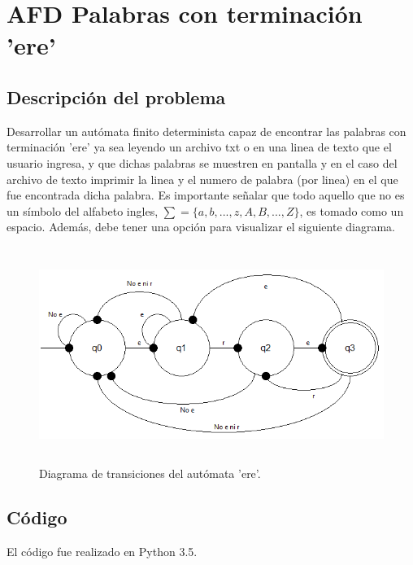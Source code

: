 \section{AFD Palabras con terminación 'ere'}
	\subsection{Descripción del problema}
	Desarrollar un autómata finito determinista capaz de encontrar las palabras con terminación 'ere' ya sea leyendo un archivo txt o en una linea de texto que el usuario ingresa, y que dichas palabras se muestren en pantalla y en el caso del archivo de texto imprimir la linea y el numero de palabra (por linea) en el que fue encontrada dicha palabra.
	Es importante señalar que todo aquello que no es un símbolo del alfabeto ingles, $ \sum =\lbrace a, b, ..., z, A, B, ..., Z \rbrace $, es tomado como un espacio. Además, debe tener una opción para visualizar el siguiente diagrama.
	\begin{figure}[H]
		\begin{center}
		\includegraphics[width=14cm, height=7cm]{img/ere.png}
		\caption{Diagrama de transiciones del autómata 'ere'.}
		\label{fig:diagrama1}
		\end{center}
	\end{figure}
	\subsection{Código}
	El código fue realizado en Python 3.5.

